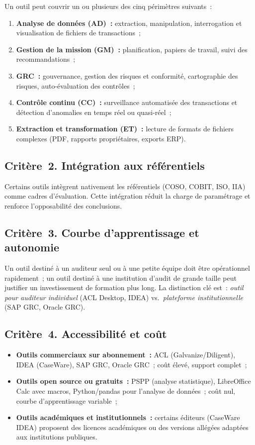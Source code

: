 Un outil peut couvrir un ou plusieurs des cinq périmètres suivants~:
\begin{enumerate}
  \item \textbf{Analyse de données (AD)~:} extraction, manipulation,
        interrogation et visualisation de fichiers de transactions~;
  \item \textbf{Gestion de la mission (GM)~:} planification, papiers de
        travail, suivi des recommandations~;
  \item \textbf{GRC~:} gouvernance, gestion des risques et conformité,
        cartographie des risques, auto-évaluation des contrôles~;
  \item \textbf{Contrôle continu (CC)~:} surveillance automatisée des
        transactions et détection d'anomalies en temps réel ou quasi-réel~;
  \item \textbf{Extraction et transformation (ET)~:} lecture de formats
        de fichiers complexes (PDF, rapports propriétaires, exports ERP).
\end{enumerate}

\subsection*{Critère~2. Intégration aux référentiels}

Certains outils intègrent nativement les référentiels (COSO, COBIT, ISO,
IIA) comme cadres d'évaluation. Cette intégration réduit la charge de
paramétrage et renforce l'opposabilité des conclusions.

\subsection*{Critère~3. Courbe d'apprentissage et autonomie}

Un outil destiné à un auditeur seul ou à une petite équipe doit être
opérationnel rapidement~; un outil destiné à une institution d'audit
de grande taille peut justifier un investissement de formation plus long.
La distinction clé est~: \emph{outil pour auditeur individuel} (ACL
Desktop, IDEA) vs.\ \emph{plateforme institutionnelle} (SAP GRC, Oracle GRC).

\subsection*{Critère~4. Accessibilité et coût}

\begin{itemize}
  \item \textbf{Outils commerciaux sur abonnement~:} ACL (Galvanize/Diligent),
        IDEA (CaseWare), SAP GRC, Oracle GRC~; coût élevé, support complet~;
  \item \textbf{Outils open source ou gratuits~:} PSPP (analyse statistique),
        LibreOffice Calc avec macros, Python/pandas pour l'analyse de données~;
        coût nul, courbe d'apprentissage variable~;
  \item \textbf{Outils académiques et institutionnels~:} certains éditeurs
        (CaseWare IDEA) proposent des licences académiques ou des versions
        allégées adaptées aux institutions publiques.
\end{itemize}

